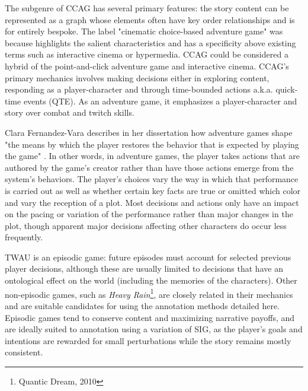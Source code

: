 The subgenre of CCAG has several primary features: the story content
can be represented as a graph whose elements often have key order
relationships and is for entirely bespoke. The label "cinematic
choice-based adventure game" was because highlights the salient
characteristics and has a specificity above existing terms such as
interactive cinema or hypermedia. CCAG could be considered a hybrid of
the point-and-click adventure game and interactive cinema. CCAG's
primary mechanics involves making decisions either in exploring
content, responding as a player-character and through time-bounded
actions a.k.a. quick-time events (QTE). As an adventure game, it
emphasizes a player-character and story over combat and twitch skills.

Clara Fernandez-Vara describes in her dissertation how adventure games
shape "the means by which the player restores the behavior that is
expected by playing the game" \cite{Fernandez_Vara2009-mt}. In other
words, in adventure games, the player takes actions that are authored
by the game's creator rather than have those actions emerge from the
system's behaviors. The player's choices vary the way in which that
performance is carried out as well as whether certain key facts are
true or omitted which color and vary the reception of a plot. Most
decisions and actions only have an impact on the pacing or variation
of the performance rather than major changes in the plot, though
apparent major decisions affecting other characters do occur less
frequently.

TWAU is an episodic game: future episodes must account for selected
previous player decisions, although these are usually limited to
decisions that have an ontological effect on the world (including the
memories of the characters). Other non-episodic games, such as \emph{Heavy
Rain}\footnote{Quantic Dream, 2010}, are closely related in their mechanics and are suitable
candidates for using the annotation methods detailed here. Episodic
games tend to conserve content and maximizing narrative payoffs, and
are ideally suited to annotation using a variation of SIG, as the
player's goals and intentions are rewarded for small perturbations
while the story remains mostly consistent.

